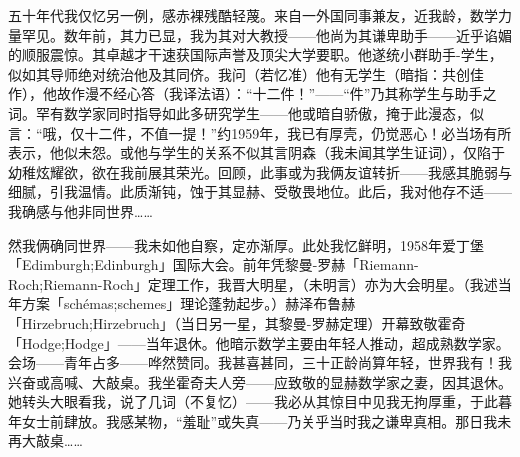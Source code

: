 五十年代我仅忆另一例，感赤裸残酷轻蔑。来自一外国同事兼友，近我龄，数学力量罕见。数年前，其力已显，我为其对大教授——他尚为其谦卑助手——近乎谄媚的顺服震惊。其卓越才干速获国际声誉及顶尖大学要职。他遂统小群助手-学生，似如其导师绝对统治他及其同侪。我问（若忆准）他有无学生（暗指：共创佳作），他故作漫不经心答（我译法语）：“十二件！”——“件”乃其称学生与助手之词。罕有数学家同时指导如此多研究学生——他或暗自骄傲，掩于此漫态，似言：“哦，仅十二件，不值一提！”约1959年，我已有厚壳，仍觉恶心！必当场有所表示，他似未怨。或他与学生的关系不似其言阴森（我未闻其学生证词），仅陷于幼稚炫耀欲，欲在我前展其荣光。回顾，此事或为我俩友谊转折——我感其脆弱与细腻，引我温情。此质渐钝，蚀于其显赫、受敬畏地位。此后，我对他存不适——我确感与他非同世界……

然我俩确同世界——我未如他自察，定亦渐厚。此处我忆鲜明，1958年爱丁堡「Edimburgh;Edinburgh」国际大会。前年凭黎曼-罗赫「Riemann-Roch;Riemann-Roch」定理工作，我晋大明星，（未明言）亦为大会明星。（我述当年方案「schémas;schemes」理论蓬勃起步。）赫泽布鲁赫「Hirzebruch;Hirzebruch」（当日另一星，其黎曼-罗赫定理）开幕致敬霍奇「Hodge;Hodge」——当年退休。他暗示数学主要由年轻人推动，超成熟数学家。会场——青年占多——哗然赞同。我甚喜甚同，三十正龄尚算年轻，世界我有！我兴奋或高喊、大敲桌。我坐霍奇夫人旁——应致敬的显赫数学家之妻，因其退休。她转头大眼看我，说了几词（不复忆）——我必从其惊目中见我无拘厚重，于此暮年女士前肆放。我感某物，“羞耻”或失真——乃关乎当时我之谦卑真相。那日我未再大敲桌……